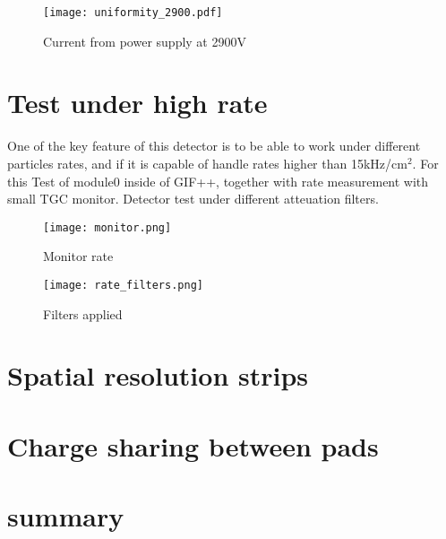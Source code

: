 \begin{figure}[ht]
	\centering
	\texttt{[image: uniformity\_2900.pdf]}
	\caption{Current from power supply at 2900V}\label{fig:2900V}
\end{figure}


\section{Test under high rate}


One of the key feature of this detector is to be able to work under different particles rates, and if it is capable of handle rates higher than
\unit{15}{kHz/cm$^2$}. For this Test of module0 inside of GIF++, together with rate measurement with small TGC monitor. 
Detector test under different atteuation filters.

\begin{figure}
	\centering
	\texttt{[image: monitor.png]}
	\caption{Monitor rate}
	\texttt{[image: rate\_filters.png]}
	\caption{Filters applied}
\end{figure}

\section{Spatial resolution strips}
\newpage
\section{Charge sharing between pads}
\newpage
\section{summary}
